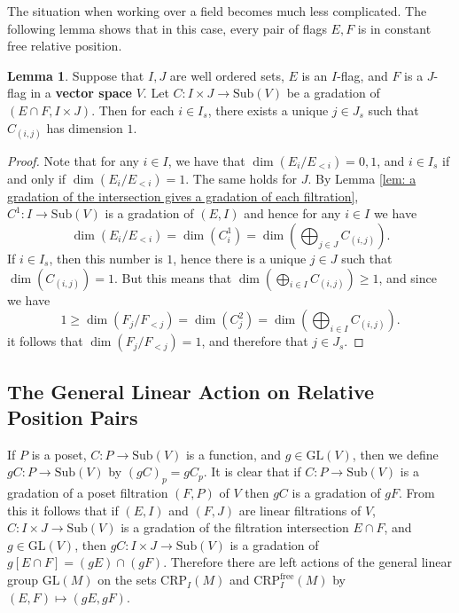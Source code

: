 \documentclass[oneside,11pt]{amsart}
\newcommand{\free}{\ensuremath{\text{free}}}
\newcommand{\CRP}{\ensuremath{\text{CRP}}}
\newcommand{\GL}{\ensuremath{\text{GL}}}
\newcommand{\Sub}{\ensuremath{\text{Sub}}}
\theoremstyle{definition}
\newtheorem{proof techniques}{Proof Techniques}
\newtheorem{lemma}{Lemma}
\begin{document}


The situation when working over a field becomes much less complicated. The following lemma shows that in this case, every pair of flags $E, F$ is in constant free relative position. 

\begin{lemma}\label{lem: over a field every pair is in constant free relative position}
Suppose that $I, J$ are well ordered sets, $E$ is an $I$-flag, and $F$ is a $J$-flag in a \textbf{vector space} $V$. Let $C: I \times J \to \Sub(V)$ be a gradation of $(E \cap F , I \times J)$. Then for each $i \in I_s$, there exists a unique $j \in J_s$ such that $C_{(i , j)}$ has dimension $1$.
\end{lemma}

\begin{proof}
Note that for any $i \in I$, we have that $\dim(E_i / E_{<i} ) = 0 , 1$, and $i \in I_s$ if and only if $\dim(E_i / E_{<i} ) = 1$. The same holds for $J$. By Lemma \ref{lem: a gradation of the intersection gives a gradation of each filtration}, $C^1 : I \to \Sub(V)$ is a gradation of $(E , I)$ and hence for any $i \in I$ we have 
\begin{equation*}
\dim( E_i / E_{<i} ) = \dim( C^1_i  ) = \dim (\bigoplus_{j \in J} C_{(i , j)} ).
\end{equation*}
If $i \in I_s$, then this number is $1$, hence there is a unique $j \in J$ such that $\dim(C_{(i , j)}) = 1$. But this means that $\dim( \bigoplus_{i \in I} C_{(i , j)} ) \geq 1$, and since we have 
\begin{equation*}
1 \geq \dim( F_j / F_{<j} ) = \dim( C^2_j  ) =  \dim( \bigoplus_{i \in I} C_{(i , j)} ).
\end{equation*}
it follows that $\dim(F_j / F_{<j}) = 1$, and therefore that $j \in J_s$. 
\end{proof}







\subsection{The General Linear Action on Relative Position Pairs}

If $P$ is a poset, $C : P \to \Sub(V)$ is a function, and $g \in \GL(V)$, then we define $gC : P \to \Sub(V)$ by $(gC)_p = gC_p$. It is clear that if $C : P \to \Sub(V)$ is a gradation of a poset filtration $(F , P)$ of $V$ then $g C$ is a gradation of $gF$. From this it follows that if $(E , I)$ and $(F , J)$ are linear filtrations of $V$, $C : I \times J \to \Sub(V)$ is a gradation of the filtration intersection $E \cap F$, and $g \in \GL(V)$, then $g C : I \times J \to \Sub(V)$ is a gradation of $g[E \cap F] = (gE) \cap (gF)$. Therefore there are left actions of the general linear group $\GL(M)$ on the sets $\CRP_I(M)$ and $\CRP_I^\free(M)$ by $(E , F) \mapsto (gE , gF)$. 
\end{document}

